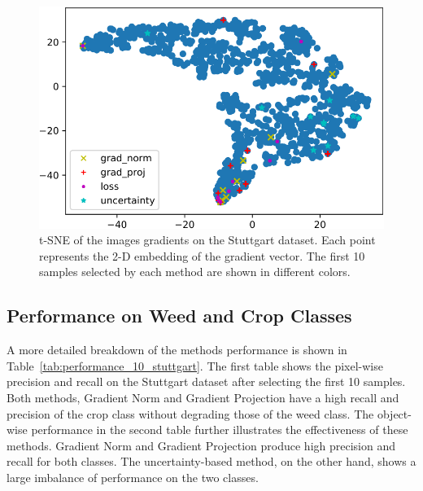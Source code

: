 \documentclass[letterpaper, 10 pt, conference]{ieeeconf}  %
\begin{document}
    
    
 \begin{figure}
    \centering
    \includegraphics[width=0.8\linewidth]{pics/tsne_all-crop.pdf}
   		\caption{t-SNE of the images gradients on the Stuttgart dataset. Each point represents the 2-D embedding of the gradient vector. The first 10 samples selected by each method are shown in different colors.}
		\label{fig:tsne}    		
     \vspace{-2em}
   \end{figure}
   
  
\subsection{Performance on Weed and Crop Classes}
    
A more detailed breakdown of the methods performance is shown in Table~\ref{tab:performance_10_stuttgart}. The first table shows the pixel-wise precision and recall on the Stuttgart dataset after selecting the first 10 samples. Both methods, Gradient Norm and Gradient Projection have a high recall and precision of the crop class without degrading those of the weed class. The object-wise performance in the second table further illustrates the effectiveness of these methods. Gradient Norm and Gradient Projection produce high precision and recall for both classes. The uncertainty-based method, on the other hand, shows a large imbalance of performance on the two classes.
   


\end{document}
